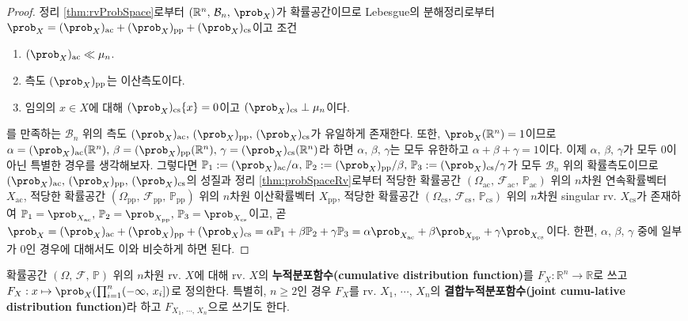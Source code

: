\begin{proof}
    정리 \ref{thm:rvProbSpace}로부터 $(\mathbb{R}^n,\,\mathcal{B}_n,\,\prob_X)$가 확률공간이므로 Lebesgue의 분해정리로부터 $\prob_X=(\prob_X)_\mathrm{ac}+(\prob_X)_\mathrm{pp}+(\prob_X)_\mathrm{cs}$이고 조건
    \begin{enumerate}
        \item $(\prob_X)_\mathrm{ac}\ll\mu_n$.
        \item 측도 $(\prob_X)_\mathrm{pp}$는 이산측도이다.
        \item 임의의 $x\in X$에 대해 $(\prob_X)_\mathrm{cs}\{x\}=0$이고 $(\prob_X)_\mathrm{cs}\perp\mu_n$이다.
    \end{enumerate}
    를 만족하는 $\mathcal{B}_n$ 위의 측도 $(\prob_X)_\mathrm{ac},\,(\prob_X)_\mathrm{pp},\,(\prob_X)_\mathrm{cs}$가 유일하게 존재한다. 또한, $\prob_X(\mathbb{R}^n)=1$이므로 $\alpha=(\prob_X)_\mathrm{ac}(\mathbb{R}^n),\,\beta=(\prob_X)_\mathrm{pp}(\mathbb{R}^n),\,\gamma=(\prob_X)_\mathrm{cs}(\mathbb{R}^n)$라 하면 $\alpha,\,\beta,\,\gamma$는 모두 유한하고 $\alpha+\beta+\gamma=1$이다. 이제 $\alpha,\,\beta,\,\gamma$가 모두 $0$이 아닌 특별한 경우를 생각해보자. 그렇다면 $\mathbb{P}_1:=(\prob_X)_\mathrm{ac}/\alpha,\,\mathbb{P}_2:=(\prob_X)_\mathrm{pp}/\beta,\,\mathbb{P}_3:=(\prob_X)_\mathrm{cs}/\gamma$가 모두 $\mathcal{B}_n$ 위의 확률측도이므로 $(\prob_X)_\mathrm{ac},\,(\prob_X)_\mathrm{pp},\,(\prob_X)_\mathrm{cs}$의 성질과 정리 \ref{thm:probSpaceRv}로부터 적당한 확률공간 $(\Omega_\mathrm{ac},\,\mathcal{F}_\mathrm{ac},\,\mathbb{P}_\mathrm{ac})$ 위의 $n$차원 연속확률벡터 $X_\mathrm{ac}$, 적당한 확률공간 $(\Omega_\mathrm{pp},\,\mathcal{F}_\mathrm{pp},\,\mathbb{P}_\mathrm{pp})$ 위의 $n$차원 이산확률벡터 $X_\mathrm{pp}$, 적당한 확률공간 $(\Omega_\mathrm{cs},\,\mathcal{F}_\mathrm{cs},\,\mathbb{P}_\mathrm{cs})$ 위의 $n$차원 singular rv. $X_\mathrm{cs}$가 존재하여 $\mathbb{P}_1=\prob_{X_\mathrm{ac}},\,\mathbb{P}_2=\prob_{X_\mathrm{pp}},\,\mathbb{P}_3=\prob_{X_\mathrm{cs}}$이고, 곧 $\prob_X=(\prob_X)_\mathrm{ac}+(\prob_X)_\mathrm{pp}+(\prob_X)_\mathrm{cs}=\alpha\mathbb{P}_1+\beta\mathbb{P}_2+\gamma\mathbb{P}_3=\alpha\prob_{X_\mathrm{ac}}+\beta\prob_{X_\mathrm{pp}}+\gamma\prob_{X_\mathrm{cs}}$이다. 한편, $\alpha,\,\beta,\,\gamma$ 중에 일부가 $0$인 경우에 대해서도 이와 비슷하게 하면 된다.
\end{proof}

\begin{definition}
    확률공간 $(\Omega,\,\mathcal{F},\,\mathbb{P})$ 위의 $n$차원 rv. $X$에 대해 rv. $X$의 \textbf{누적분포함수(cumulative distribution function)}를 $F_X:\mathbb{R}^n\to\mathbb{R}$로 쓰고 $F_X:x\mapsto\prob_X(\prod_{i=1}^n(-\infty,\,x_i])$로 정의한다. 특별히, $n\geq2$인 경우 $F_X$를 rv. $X_1,\,\cdots,\,X_n$의 \textbf{결합누적분포함수(joint cumu-lative distribution function)}라 하고 $F_{X_1,\,\cdots,\,X_n}$으로 쓰기도 한다.
\end{definition}

